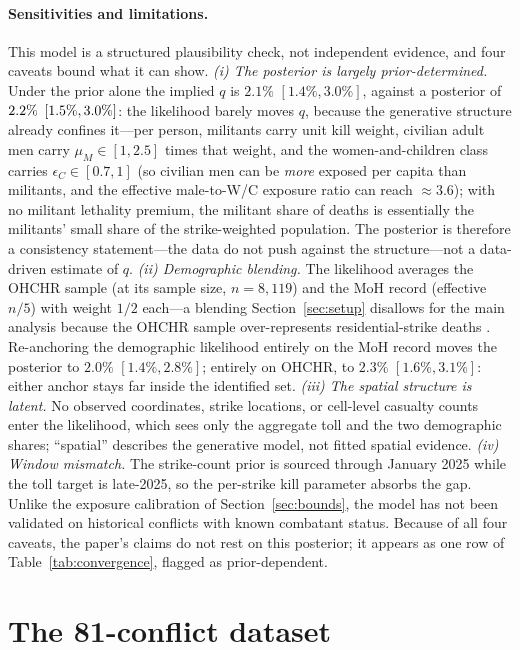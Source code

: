 \paragraph{Sensitivities and limitations.} This model is a structured plausibility check, not independent evidence, and four caveats bound what it can show. \emph{(i) The posterior is largely prior-determined.} Under the prior alone the implied $q$ is $2.1\%$ $[1.4\%,3.0\%]$, against a posterior of $2.2{}\%$ $[1.5{}\%,3.0{}\%]$: the likelihood barely moves $q$, because the generative structure already confines it---per person, militants carry unit kill weight, civilian adult men carry $\mu_M\in[1,2.5]$ times that weight, and the women-and-children class carries $\epsilon_C\in[0.7,1]$ (so civilian men can be \emph{more} exposed per capita than militants, and the effective male-to-W/C exposure ratio can reach ${\approx}3.6$); with no militant lethality premium, the militant share of deaths is essentially the militants' small share of the strike-weighted population. The posterior is therefore a consistency statement---the data do not push against the structure---not a data-driven estimate of $q$. \emph{(ii) Demographic blending.} The likelihood averages the OHCHR sample (at its sample size, $n=8{,}119$) and the MoH record (effective $n/5$) with weight $1/2$ each---a blending Section~\ref{sec:setup} disallows for the main analysis because the OHCHR sample over-represents residential-strike deaths \citep{spagatcockerill2024}. Re-anchoring the demographic likelihood entirely on the MoH record moves the posterior to $2.0\%$ $[1.4\%,2.8\%]$; entirely on OHCHR, to $2.3\%$ $[1.6\%,3.1\%]$: either anchor stays far inside the identified set. \emph{(iii) The spatial structure is latent.} No observed coordinates, strike locations, or cell-level casualty counts enter the likelihood, which sees only the aggregate toll and the two demographic shares; ``spatial'' describes the generative model, not fitted spatial evidence. \emph{(iv) Window mismatch.} The strike-count prior is sourced through January 2025 while the toll target is late-2025, so the per-strike kill parameter absorbs the gap. Unlike the exposure calibration of Section~\ref{sec:bounds}, the model has not been validated on historical conflicts with known combatant status. Because of all four caveats, the paper's claims do not rest on this posterior; it appears as one row of Table~\ref{tab:convergence}, flagged as prior-dependent.

\section{The 81-conflict dataset}\label{app:conflicts}

